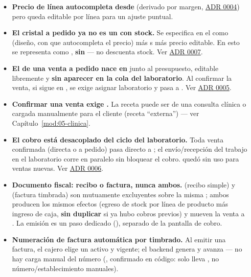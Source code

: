 \begin{itemize}
  \item \textbf{Precio de línea autocompleta desde \allowbreak {}} (derivado por margen, \hyperref[adr:0004]{ADR 0004}) pero queda editable por línea para un ajuste puntual.
  \item \textbf{El cristal a pedido ya no es un  con stock.} Se especifica en el  como  (diseño, con  que autocompleta el precio) más s más precio editable. En  esto se representa como , \textbf{sin } --- no descuenta stock. Ver \hyperref[adr:0007]{ADR 0007}.
  \item \textbf{El  de una venta a pedido nace en } junto al presupuesto, editable libremente y \textbf{sin aparecer en la cola del laboratorio}. Al confirmar la venta, si sigue en , se exige asignar laboratorio y pasa a \allowbreak {}. Ver \hyperref[adr:0005]{ADR 0005}.
  \item \textbf{Confirmar una venta  exige .} La receta puede ser de una consulta clínica o cargada manualmente para el cliente (receta ``externa'') --- ver Capítulo~\ref{mod:05-clinica}.
  \item \textbf{El cobro está desacoplado del ciclo del laboratorio.} Toda venta confirmada (directa o a pedido) pasa directo a ; el envío/recepción del trabajo en el laboratorio corre en paralelo sin bloquear el cobro. \allowbreak {} quedó sin uso para ventas nuevas. Ver \hyperref[adr:0006]{ADR 0006}.
  \item \textbf{Documento fiscal: recibo o factura, nunca ambos.}  (recibo simple) y  (factura timbrada) son mutuamente excluyentes sobre la misma ; ambos producen los mismos efectos (egreso de stock por línea de producto más ingreso de caja, \textbf{sin duplicar} si ya hubo cobros previos) y mueven la venta a \allowbreak {}. La emisión es un paso dedicado (\allowbreak {}\allowbreak {}), separado de la pantalla de cobro.
  \item \textbf{Numeración de factura automática por timbrado.} Al emitir una factura, el cajero elige un  activo y vigente; el backend genera \allowbreak {}\allowbreak {} y avanza \allowbreak {} --- no hay carga manual del número (, confirmado en código: \allowbreak {}\allowbreak {} solo lleva , no número/establecimiento manuales).

\end{itemize}
